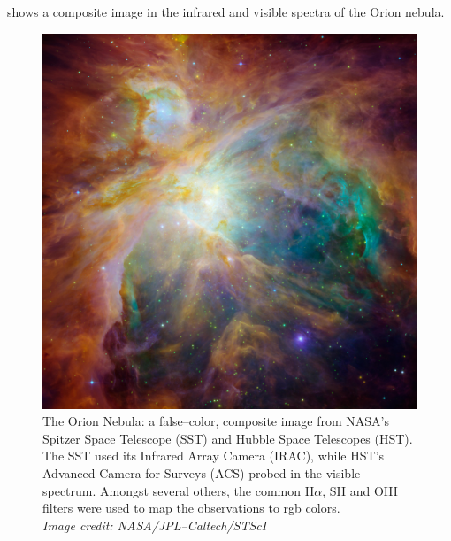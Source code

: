  shows a composite image in the infrared and visible spectra of the Orion nebula.

\begin{figure}[ht]
 \centering
 \includegraphics[width=\textwidth]{Figures/orion_nebula}
 \captionsetup{justification=justified,singlelinecheck=false,width=\linewidth}
 \decoRule
 \caption[The Orion Nebula]{The Orion Nebula: a false--color, composite image from NASA's Spitzer Space Telescope (SST) and Hubble Space Telescopes (HST).
			    The SST used its Infrared Array Camera (IRAC), while HST's Advanced Camera for Surveys (ACS) probed in the visible spectrum.
			    Amongst several others, the common H$\alpha$, SII and OIII filters were used to map the observations to rgb colors.\\
			    \textit{Image credit: NASA/JPL--Caltech/STScI}}
 \label{fig:Orion_nebula}
\end{figure}

